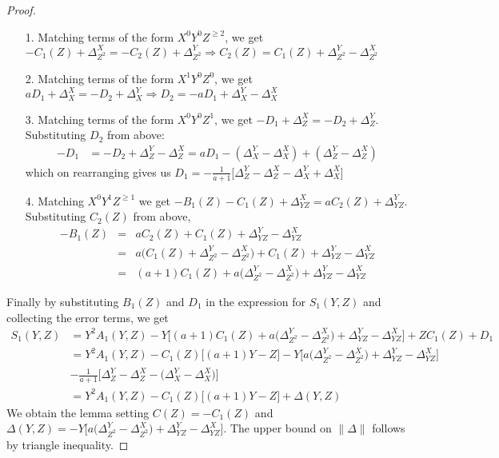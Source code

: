 \begin{proof}
	\begin{itemize}
		\item[1.] Matching terms of the form $X^0Y^0Z^{\ge 2}$, we get  $-C_1(Z) + \Delta^X_{Z^2} = -C_2(Z) + \Delta^Y_{Z^2} \Rightarrow C_2(Z) = C_1(Z) + \Delta^Y_{Z^2} - \Delta^X_{Z^2}$
		\item[2.] Matching terms of the form $X^1Y^0Z^0$, we get $aD_1 + \Delta^X_{X} = -D_2 + \Delta^Y_X \Rightarrow D_2 = - aD_1 + \Delta^Y_X - \Delta^X_X$
		\item[3.] Matching terms of the form $X^0Y^0Z^1$, we get $-D_1 + \Delta^{X}_Z= -D_2 + \Delta^{Y}_Z$. Substituting $D_2$ from above:
		\begin{align*}
		-D_1 &= - D_2  + \Delta^Y_Z - \Delta^X_Z
		     = aD_1 - (\Delta^Y_X - \Delta^X_X)  + (\Delta^Y_Z - \Delta^X_Z) 
		\end{align*}
		which on rearranging gives us
		$D_1 = -\frac{1}{a+1}\Big[ \Delta^Y_Z - \Delta^X_Z - \Delta^Y_X + \Delta^X_X\Big]$
\item[4.] Matching $X^0Y^1Z^{\ge 1}$ we get $-B_1(Z) - C_1(Z) + \Delta^X_{YZ} = aC_2(Z) + \Delta^Y_{YZ}$. Substituting $C_2(Z)$ from above,
		\begin{eqnarray*}
		-B_1(Z) &=& aC_2(Z) + C_1(Z) + \Delta^Y_{YZ} - \Delta^X_{YZ}  \\
				&=& a\Big(C_1(Z) + \Delta^Y_{Z^2} - \Delta^X_{Z^2}\Big) + C_1(Z) + \Delta^Y_{YZ} - \Delta^X_{YZ}  \\	
				&=& (a + 1)C_1(Z) + a\big(\Delta^Y_{Z^2} - \Delta^X_{Z^2}\big) + \Delta^Y_{YZ} - \Delta^X_{YZ} 	
		\end{eqnarray*}
	\end{itemize}
	Finally by substituting $B_1(Z)$ and $D_1$ in the expression for $S_1(Y,Z)$ and collecting the error terms, we get
	\begin{align*}
	S_1(Y,Z) &= Y^2A_1(Y,Z) - Y\Big[(a + 1)C_1(Z) + a\big(\Delta^Y_{Z^2} - \Delta^X_{Z^2}\big) + \Delta^Y_{YZ} - \Delta^X_{YZ}\Big] + ZC_1(Z) + D_1 \\
	&=   Y^2A_1(Y,Z) -C_1(Z)\Big[(a+1)Y - Z\Big] - Y\Big[a\big(\Delta^Y_{Z^2} - \Delta^X_{Z^2}\big) + \Delta^Y_{YZ} - \Delta^X_{YZ}\Big]\\ 
	&- \frac{1}{a+1}\Big[\Delta^Y_Z - \Delta^X_Z - \big(\Delta^Y_X - \Delta^X_X \big)\Big]\\
	&=   Y^2A_1(Y,Z) -C_1(Z)\Big[(a+1)Y - Z\Big] + \Delta(Y,Z)
	\end{align*}
We obtain the lemma setting $C(Z) = -C_1(Z)$ and $\Delta(Y,Z) = - Y\Big[a\big(\Delta^Y_{Z^2} - \Delta^X_{Z^2}\big) + \Delta^Y_{YZ} - \Delta^X_{YZ}\Big]$.
The upper bound on $\|\Delta\|$ follows by triangle inequality.		
	\end{proof}
	
